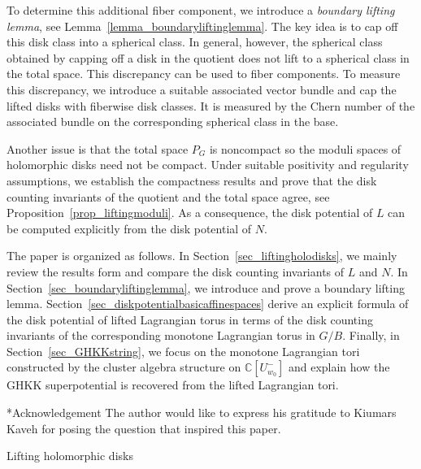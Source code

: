 \documentclass[11pt]{amsart}
\makeatletter
\def\section{\@startsection{section}{1}%
  \z@{-1.2\linespacing\@plus-.5\linespacing}{.8\linespacing}%
  {\normalfont\bfseries\large}}
\def\subsection{\@startsection{subsection}{2}%
  \z@{-.8\linespacing\@plus-.3\linespacing}{.3\linespacing\@plus.2\linespacing}%
  {\normalfont\bfseries}}
\theoremstyle{plain}
\theoremstyle{definition}
\theoremstyle{remark}
\newcommand{\C}{\mathbb{C}}
\numberwithin{equation}{section} \numberwithin{table}{section}
\numberwithin{equation}{section}
\makeatother
\begin{document}
To determine this additional fiber component, we introduce a \emph{boundary lifting lemma}, see Lemma~\ref{lemma_boundaryliftinglemma}. The key idea is to cap off this disk class into a spherical class. In general, however, the spherical class obtained by capping off a disk in the quotient does not lift to a spherical class in the total space. This discrepancy can be used to fiber components.  To measure this discrepancy, we introduce a suitable associated vector bundle and cap the lifted disks with fiberwise disk classes. It is measured by the Chern number of the associated bundle on the corresponding spherical class in the base. 

Another issue is that the total space $P_G$ is noncompact so the moduli spaces of holomorphic disks need not be compact. Under suitable positivity and regularity assumptions, we establish the compactness results and prove that the disk counting invariants of the quotient and the total space agree, see Proposition~\ref{prop_liftingmoduli}. As a consequence, the disk potential of $L$ can be computed explicitly from the disk potential of $N$.

The paper is organized as follows. 
In Section~\ref{sec_liftingholodisks}, we mainly review the results form \cite{Kim26} and compare the disk counting invariants of $L$ and $N$. In Section~\ref{sec_boundaryliftinglemma}, we introduce and prove a boundary lifting lemma. Section~\ref{sec_diskpotentialbasicaffinespaces} derive an explicit formula of the disk potential of lifted Lagrangian torus in terms of the disk counting invariants of the corresponding monotone Lagrangian torus in $G/B$. Finally, in Section~\ref{sec_GHKKstring}, we focus on the monotone Lagrangian tori constructed by the cluster algebra structure on $\C[U^{-}_{w_0}]$ and explain how the GHKK superpotential is recovered from the lifted Lagrangian tori.

\subsection*{Acknowledgement} 
The author would like to express his gratitude to Kiumars Kaveh for posing the question that inspired this paper.





\section{Lifting holomorphic disks}\label{sec_liftingholodisks}
\end{document}
